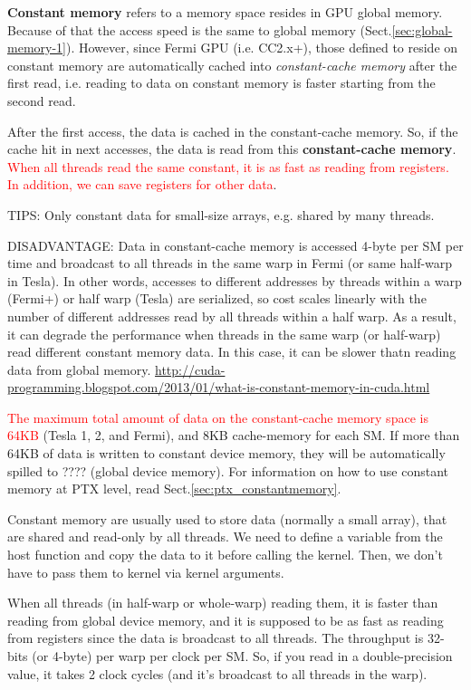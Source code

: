 {\bf Constant memory} refers to a memory space resides in GPU global memory.
Because of that the access speed is the same to global memory
(Sect.\ref{sec:global-memory-1}).  However, since Fermi GPU (i.e. CC2.x+), those
defined to reside on constant memory are automatically cached into {\it
constant-cache memory} after the first read, i.e. reading to data on constant
memory is faster starting from the second read.


After the first access, the data is cached in the constant-cache memory. So, if
the cache hit in next accesses, the data is read from this {\bf constant-cache
memory}. \textcolor{red}{When all threads read the same constant, it is as fast as
reading from registers. In addition, we can save registers for other data}.

TIPS: Only constant data for small-size arrays, e.g. shared by many threads.

DISADVANTAGE: Data in constant-cache memory is accessed 4-byte per SM per
time and  broadcast to all threads in the same warp in Fermi (or same half-warp
in Tesla). In other words, accesses to different addresses by threads within a
warp (Fermi+) or half warp (Tesla) are serialized, so cost scales linearly with
the number of different addresses read by all threads within a half warp.
As a result, it can degrade the performance when threads in the same warp (or
half-warp) read different constant memory data. In this case, it can be slower
thatn reading data from global memory.
\url{http://cuda-programming.blogspot.com/2013/01/what-is-constant-memory-in-cuda.html}
  

\begin{mdframed}
  \textcolor{red}{The maximum total amount of data on the
    constant-cache memory space is 64KB} (Tesla 1, 2, and Fermi), and 8KB
    cache-memory for each SM. If more than 64KB of data is written to constant device memory, they will
be automatically spilled to ???? (global device memory). For information on how
to use constant memory at PTX level, read Sect.\ref{sec:ptx_constantmemory}.
    

  Constant memory are usually used to store data (normally a small
  array), that are shared and read-only by all threads. We need to
  define a variable from the host function and copy the data to it
  before calling the kernel. Then, we don't have to pass them to
  kernel via kernel arguments. 

  When all threads (in half-warp or whole-warp) reading them, it is
  faster than reading from global device memory, and it is supposed to
  be as fast as reading from registers since the data is broadcast to
  all threads. The throughput is 32-bits (or 4-byte) per warp per
  clock per SM. So, if you read in a double-precision value, it takes
  2 clock cycles (and it's broadcast to all threads in the warp).
\end{mdframed}
 

